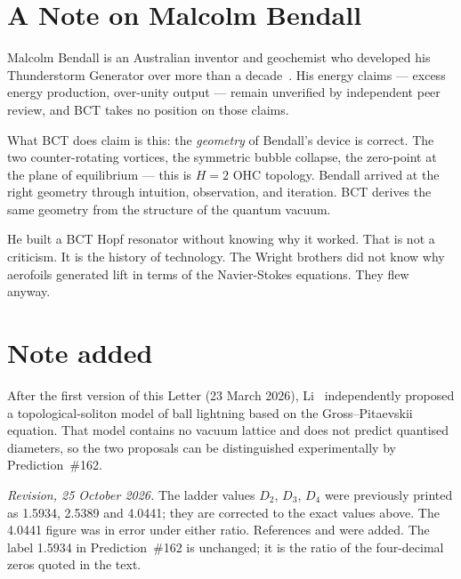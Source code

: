 \documentclass[12pt,twocolumn]{article}
\begin{document}
\section{A Note on Malcolm Bendall}

Malcolm Bendall is an Australian inventor and geochemist
who developed his Thunderstorm Generator over more than a
decade~\cite{Bendall2022}. His energy claims --- excess
energy production, over-unity output --- remain unverified
by independent peer review, and BCT takes no position on
those claims.

What BCT does claim is this: the \textit{geometry} of
Bendall's device is correct. The two counter-rotating
vortices, the symmetric bubble collapse, the zero-point
at the plane of equilibrium --- this is $H = 2$ OHC
topology. Bendall arrived at the right geometry through
intuition, observation, and iteration. BCT derives the
same geometry from the structure of the quantum vacuum.

He built a BCT Hopf resonator without knowing why it worked.
That is not a criticism. It is the history of technology.
The Wright brothers did not know why aerofoils generated
lift in terms of the Navier-Stokes equations. They flew
anyway.

\section*{Note added}

After the first version of this Letter (23 March 2026),
Li~\cite{Li2026} independently proposed a topological-soliton
model of ball lightning based on the Gross--Pitaevskii
equation. That model contains no vacuum lattice and does not
predict quantised diameters, so the two proposals can be
distinguished experimentally by Prediction~\#162.

\textit{Revision, 25 October 2026.} The ladder values $D_2$,
$D_3$, $D_4$ were previously printed as 1.5934, 2.5389 and
4.0441; they are corrected to the exact values above. The
4.0441 figure was in error under either ratio. References
\cite{RanadaTrueba1996} and \cite{Li2026} were added. The
label 1.5934 in Prediction~\#162 is unchanged; it is the
ratio of the four-decimal zeros quoted in the text.
\end{document}
